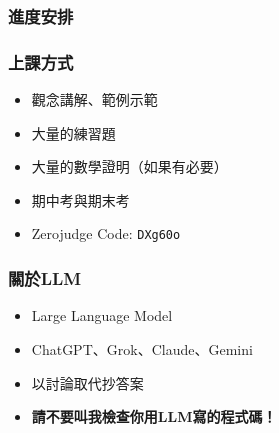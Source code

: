 \documentclass[xcolor=dvipsnames]{beamer}
\begin{document}
    \begin{frame}
        \frametitle{進度安排}
    \end{frame}

    \begin{frame}
        \frametitle{上課方式}
        \begin{itemize}
            \item 觀念講解、範例示範
            \item 大量的練習題
            \item 大量的數學證明（如果有必要）
            \item 期中考與期末考
            \item Zerojudge Code: \texttt{DXg60o}
        \end{itemize}
    \end{frame}

    \begin{frame}
        \frametitle{關於LLM}
        \begin{itemize}
            \item Large Language Model
            \item ChatGPT、Grok、Claude、Gemini
            \item 以討論取代抄答案
            \item \textbf{請不要叫我檢查你用LLM寫的程式碼！}
        \end{itemize}
    \end{frame}
\end{document}
